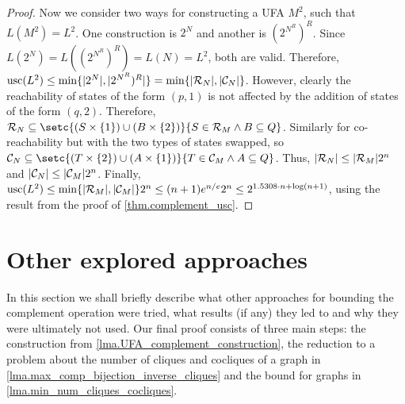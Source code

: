 \documentclass{report}
\DeclarePairedDelimiter{\set}{\{}{\}}
\DeclarePairedDelimiter{\abs}{\lvert}{\rvert}
\theoremstyle{definition}
\begin{document}
\begin{proof}
Now we consider two ways for constructing a UFA $M^2$, such that $L(M^2) = L^2$.
One construction is $2^N$ and another is $(2^{N^R})^R$. Since
$L(2^N) = L((2^{N^R})^R) = L(N) = L^2$, both are valid. Therefore,
$\mathrm{usc}(L^2) \leq \min\set{\abs{2^N}, \abs{2^{N^R})^R}} =
\min\set{\abs{\mathcal{R}_N}, \abs{\mathcal{C}_N}}$. However, clearly the
reachability of states of the form $(p, 1)$ is not affected by the addition
of states of the form $(q, 2)$. Therefore,
${\mathcal{R}_N \subseteq \setc{(S \times \set{1}) \cup (B \times \set{2})}
{S \in \mathcal{R}_M \wedge B \subseteq Q}}$. Similarly for co-reachability but
with the two types of states swapped, so  $\mathcal{C}_N \subseteq
\setc{(T \times \set{2}) \cup (A \times \set{1})}
{T \in \mathcal{C}_M \wedge A \subseteq Q}$. Thus,
$\abs{\mathcal{R}_N} \leq \abs{\mathcal{R}_M} 2^n$ and
$\abs{\mathcal{C}_N} \leq \abs{\mathcal{C}_M} 2^n$. Finally, $\mathrm{usc}(L^2)
\leq \min\set{\abs{\mathcal{R}_M}, \abs{\mathcal{C}_M}} 2^n
\leq (n + 1) e^{n / e} 2^n \leq 2^{1.5308 \cdot n + \log (n + 1)}$, using the result
from the proof of \cref{thm.complement_usc}.
\end{proof}

\section{Other explored approaches}

In this section we shall briefly describe what other approaches for bounding
the complement operation were tried, what results (if any) they led to and why
they were ultimately not used. Our final proof consists of three main steps:
the construction from \cref{lma.UFA_complement_construction}, the reduction to a
problem about the number of cliques and cocliques of a graph in
\cref{lma.max_comp_bijection_inverse_cliques} and the bound for graphs in
\cref{lma.min_num_cliques_cocliques}.
\end{document}
